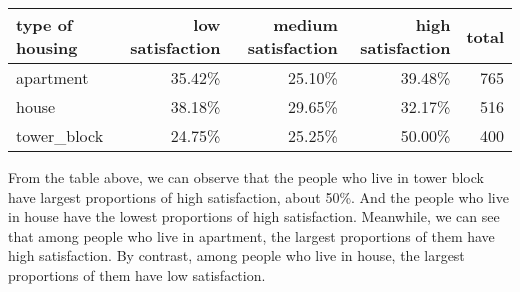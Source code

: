 \documentclass[]{article}
\newenvironment{Shaded}{\begin{snugshade}}{\end{snugshade}}
\newcommand{\KeywordTok}[1]{\textcolor[rgb]{0.13,0.29,0.53}{\textbf{#1}}}
\newcommand{\DataTypeTok}[1]{\textcolor[rgb]{0.13,0.29,0.53}{#1}}
\newcommand{\StringTok}[1]{\textcolor[rgb]{0.31,0.60,0.02}{#1}}
\newcommand{\OperatorTok}[1]{\textcolor[rgb]{0.81,0.36,0.00}{\textbf{#1}}}
\newcommand{\NormalTok}[1]{#1}
\begin{document}
\begin{Shaded}
\end{Shaded}

\begin{longtable}[]{@{}lrrrr@{}}
\toprule
type of housing & low satisfaction & medium satisfaction & high
satisfaction & total\tabularnewline
\midrule
\endhead
apartment & 35.42\% & 25.10\% & 39.48\% & 765\tabularnewline
house & 38.18\% & 29.65\% & 32.17\% & 516\tabularnewline
tower\_block & 24.75\% & 25.25\% & 50.00\% & 400\tabularnewline
\bottomrule
\end{longtable}

From the table above, we can observe that the people who live in tower
block have largest proportions of high satisfaction, about 50\%. And the
people who live in house have the lowest proportions of high
satisfaction. Meanwhile, we can see that among people who live in
apartment, the largest proportions of them have high satisfaction. By
contrast, among people who live in house, the largest proportions of
them have low satisfaction.
\end{document}

